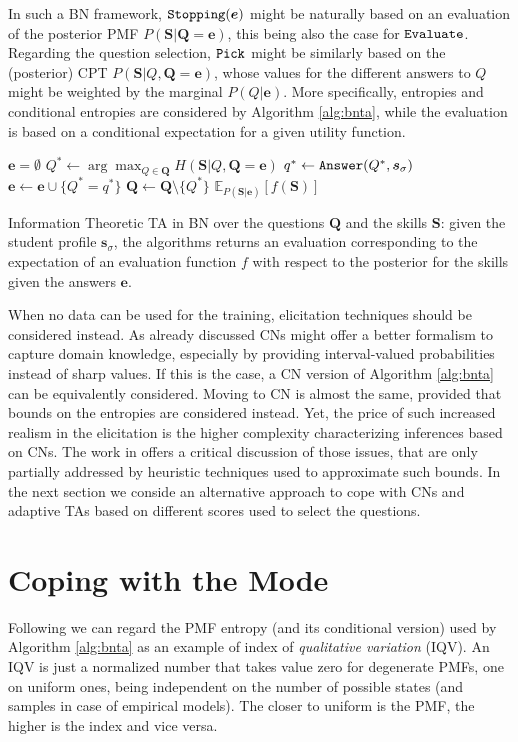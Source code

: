 \documentclass[runningheads]{llncs}
\begin{document}
In such a BN framework, ${\tt Stopping}(\bm{e})$ might be naturally based on an evaluation of the posterior PMF $P(\bm{S}|\bm{Q}=\bm{e})$, this being also the case for ${\tt Evaluate}$. Regarding the question selection, ${\tt Pick}$ might be similarly based on the (posterior) CPT $P(\bm{S}|Q,\bm{Q}=\bm{e})$, whose values for the different answers to $Q$ might be weighted by the marginal $P(Q|\bm{e})$. More specifically, entropies and conditional entropies are considered by Algorithm \ref{alg:bnta}, while the evaluation is based on a conditional expectation for a given utility function.

\begin{algorithm}[htp!]
\begin{algorithmic}[1]
\STATE $\bm{e}=\emptyset$
\STATE $Q^* \gets \arg\max_{Q \in \bm{Q}} H(\bm{S}|Q,\bm{Q}=\bm{e})$
\STATE $q^* \gets {\tt{Answer}}(Q^*,\bm{s}_\sigma)$
\STATE $\bm{e} \gets \bm{e} \cup \{ Q^*=q^* \}$
\STATE $\bm{Q} \gets \bm{Q} \setminus \{ Q^*\}$
\ENDWHILE
{} $\mathbb{E}_{P(\bm{S}|\bm{e})}[f(\bm{S})]$
\end{algorithmic}
\caption{Information Theoretic TA in BN over the questions $\bm{Q}$ and the skills $\bm{S}$: given the student profile $\bm{s}_\sigma$, the algorithms returns an evaluation corresponding to the expectation of an evaluation function $f$ with respect to the posterior for the skills given the answers $\bm{e}$.\label{alg:bnta}}
\end{algorithm}

When no data can be used for the training, elicitation techniques should be considered instead. As already discussed CNs might offer a better formalism to capture domain knowledge, especially by providing interval-valued probabilities instead of sharp values.
If this is the case, a CN version of Algorithm \ref{alg:bnta} can be equivalently considered. Moving to CN is almost the same, provided that bounds on the entropies are considered instead. Yet, the price of such increased realism in the elicitation is the higher complexity characterizing inferences based on CNs. The work in \cite{mangili2017b} offers a critical discussion of those issues, that are only partially addressed by heuristic techniques used to approximate such bounds. In the next section we conside an alternative approach to cope with CNs and adaptive TAs based on different scores used to select the questions.

\section{Coping with the Mode}\label{sec:mode}
Following \cite{wilcox1973indices} we can regard the PMF entropy (and its conditional version) used by Algorithm \ref{alg:bnta} as an example of index of \emph{qualitative variation} (IQV). An IQV is just a normalized number that takes value zero for degenerate PMFs, one on uniform ones, being independent on the number of possible states (and samples in case of empirical models). The closer to uniform is the PMF, the higher is the index and vice versa.
\end{document}
